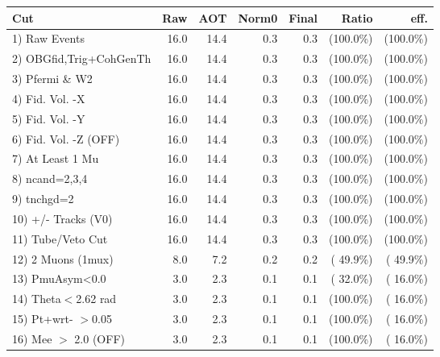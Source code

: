  \begin{table}[h!]\centering
 \begin{tabular}{||l||r|r|r|r|r|r||}
 \hline
 \hline
 Cut & Raw & AOT & Norm0 & Final & Ratio & eff.       \\
 \hline
  1) Raw Events           &         16.0 &         14.4 &          0.3 &          0.3 & (100.0\%) & (100.0\%) \\
  2) OBGfid,Trig+CohGenTh &         16.0 &         14.4 &          0.3 &          0.3 & (100.0\%) & (100.0\%) \\
  3) Pfermi \& W2         &         16.0 &         14.4 &          0.3 &          0.3 & (100.0\%) & (100.0\%) \\
  4) Fid. Vol. -X         &         16.0 &         14.4 &          0.3 &          0.3 & (100.0\%) & (100.0\%) \\
  5) Fid. Vol. -Y         &         16.0 &         14.4 &          0.3 &          0.3 & (100.0\%) & (100.0\%) \\
  6) Fid. Vol. -Z (OFF)   &         16.0 &         14.4 &          0.3 &          0.3 & (100.0\%) & (100.0\%) \\
  7) At Least 1 Mu        &         16.0 &         14.4 &          0.3 &          0.3 & (100.0\%) & (100.0\%) \\
  8) ncand=2,3,4          &         16.0 &         14.4 &          0.3 &          0.3 & (100.0\%) & (100.0\%) \\
  9) tnchgd=2             &         16.0 &         14.4 &          0.3 &          0.3 & (100.0\%) & (100.0\%) \\
 10) +/- Tracks (V0)      &         16.0 &         14.4 &          0.3 &          0.3 & (100.0\%) & (100.0\%) \\
 11) Tube/Veto Cut        &         16.0 &         14.4 &          0.3 &          0.3 & (100.0\%) & (100.0\%) \\
 12) 2 Muons (1mux)       &          8.0 &          7.2 &          0.2 &          0.2 & ( 49.9\%) & ( 49.9\%) \\
 13) PmuAsym<0.0          &          3.0 &          2.3 &          0.1 &          0.1 & ( 32.0\%) & ( 16.0\%) \\
 14) Theta$<$2.62 rad     &          3.0 &          2.3 &          0.1 &          0.1 & (100.0\%) & ( 16.0\%) \\
 15) Pt+wrt- $>$0.05      &          3.0 &          2.3 &          0.1 &          0.1 & (100.0\%) & ( 16.0\%) \\
 16) Mee $>$ 2.0  (OFF)   &          3.0 &          2.3 &          0.1 &          0.1 & (100.0\%) & ( 16.0\%) \\

\end{tabular}
\end{table}
